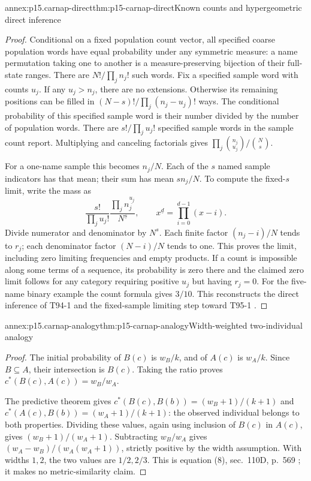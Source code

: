 \begin{annexitem}{annex:p15.carnap-direct}{thm:p15-carnap-direct}{Known counts and hypergeometric direct inference}
\begin{proof}
Conditional on a fixed population count vector, all specified coarse
population words have equal probability under any symmetric measure:
a name permutation taking one to another is a measure-preserving
bijection of their full-state ranges. There are
\(N!/\prod_j n_j!\) such words. Fix a specified sample word with
counts \(u_j\). If any \(u_j>n_j\), there are no extensions.
Otherwise its remaining positions can be filled in
\((N-s)!/\prod_j(n_j-u_j)!\) ways. The conditional probability
of this specified sample word is their number divided by the number of
population words. There are \(s!/\prod_j u_j!\) specified sample
words in the sample count report. Multiplying and canceling factorials
gives \(\prod_j\binom{n_j}{u_j}/\binom Ns\).

For a one-name sample this becomes \(n_j/N\). Each of the
\(s\) named sample indicators has that mean; their sum has mean
\(sn_j/N\). To compute the fixed-\(s\) limit, write the mass as
\[
 \frac{s!}{\prod_j u_j!}
 \frac{\prod_j n_j^{\underline{u_j}}}{N^{\underline s}},
 \qquad x^{\underline d}=\prod_{i=0}^{d-1}(x-i).
\]
Divide numerator and denominator by \(N^s\). Each finite factor
\((n_j-i)/N\) tends to \(r_j\); each denominator factor
\((N-i)/N\) tends to one. This proves the limit, including zero
limiting frequencies and empty products. If a count is impossible along
some terms of a sequence, its probability is zero there and the claimed
zero limit follows for any category requiring positive \(u_j\) but
having \(r_j=0\). For the five-name binary example the count
formula gives \(3/10\). This reconstructs the direct inference of
T94-1 and the fixed-sample limiting step toward T95-1
\cite{Carnap1950Probability}.
\end{proof}
\end{annexitem}

\begin{annexitem}{annex:p15.carnap-analogy}{thm:p15-carnap-analogy}{Width-weighted two-individual analogy}
\begin{proof}
The initial probability of \(B(c)\) is \(w_B/k\), and of
\(A(c)\) is \(w_A/k\). Since \(B\subseteq A\), their
intersection is \(B(c)\). Taking the ratio proves
\(c^*(B(c),A(c))=w_B/w_A\).

The predictive theorem gives
\(c^*(B(c),B(b))=(w_B+1)/(k+1)\) and
\(c^*(A(c),B(b))=(w_A+1)/(k+1)\): the observed individual belongs
to both properties. Dividing these values, again using inclusion of
\(B(c)\) in \(A(c)\), gives \((w_B+1)/(w_A+1)\).
Subtracting \(w_B/w_A\) gives
\((w_A-w_B)/(w_A(w_A+1))\), strictly positive by the width
assumption. With widths \(1,2\), the two values are \(1/2,2/3\).
This is equation (8), sec.~110D, p.~569
\cite{Carnap1950Probability}; it makes no metric-similarity claim.
\end{proof}
\end{annexitem}

